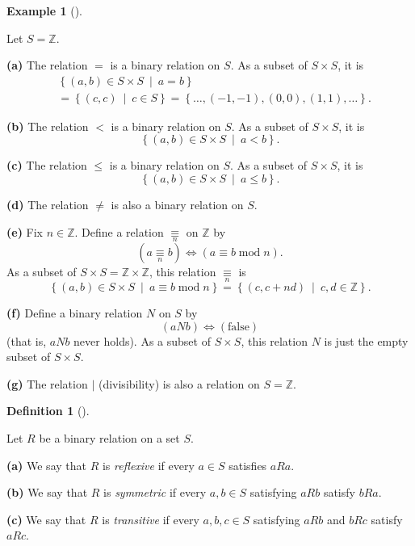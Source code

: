 \documentclass[numbers=enddot,12pt,final,onecolumn,notitlepage]{scrartcl}%
\numberwithin{exer}{subsection}
\theoremstyle{definition}
\newtheorem{defi}[theo]{Definition}
\newenvironment{definition}[1][]
{\begin{defi}[#1]\begin{leftbar}}
{\end{leftbar}\end{defi}}
\newtheorem{exam}[theo]{Example}
\newenvironment{example}[1][]
{\begin{exam}[#1]\begin{leftbar}}
{\end{leftbar}\end{exam}}
\begin{document}
\begin{example}
Let $S=\mathbb{Z}$.

\textbf{(a)} The relation $=$ is a binary relation on $S$. As a subset of
$S\times S$, it is%
\begin{align*}
&  \left\{  \left(  a,b\right)  \in S\times S\ \mid\ a=b\right\} \\
&  =\left\{  \left(  c,c\right)  \ \mid\ c\in S\right\}  =\left\{
\ldots,\left(  -1,-1\right)  ,\left(  0,0\right)  ,\left(  1,1\right)
,\ldots\right\}  .
\end{align*}


\textbf{(b)} The relation $<$ is a binary relation on $S$. As a subset of
$S\times S$, it is%
\[
\left\{  \left(  a,b\right)  \in S\times S\ \mid\ a<b\right\}  .
\]


\textbf{(c)} The relation $\leq$ is a binary relation on $S$. As a subset of
$S\times S$, it is%
\[
\left\{  \left(  a,b\right)  \in S\times S\ \mid\ a\leq b\right\}  .
\]


\textbf{(d)} The relation $\neq$ is also a binary relation on $S$.

\textbf{(e)} Fix $n\in\mathbb{Z}$. Define a relation $\underset{n}{\equiv}$ on
$\mathbb{Z}$ by
\[
\left(  a\underset{n}{\equiv}b\right)  \Longleftrightarrow\left(  a\equiv
b\operatorname{mod}n\right)  .
\]
As a subset of $S\times S=\mathbb{Z}\times\mathbb{Z}$, this relation
$\underset{n}{\equiv}$ is%
\[
\left\{  \left(  a,b\right)  \in S\times S\ \mid\ a\equiv b\operatorname{mod}%
n\right\}  =\left\{  \left(  c,c+nd\right)  \ \mid\ c,d\in\mathbb{Z}\right\}
.
\]


\textbf{(f)} Define a binary relation $N$ on $S$ by%
\[
\left(  aNb\right)  \Longleftrightarrow\left(  \text{false}\right)
\]
(that is, $aNb$ never holds). As a subset of $S\times S$, this relation $N$ is
just the empty subset of $S\times S$.

\textbf{(g)} The relation $\mid$ (divisibility) is also a relation on
$S=\mathbb{Z}$.
\end{example}

\begin{definition}
Let $R$ be a binary relation on a set $S$.

\textbf{(a)} We say that $R$ is \textit{reflexive} if every $a\in S$ satisfies
$aRa$.

\textbf{(b)} We say that $R$ is \textit{symmetric} if every $a,b\in S$
satisfying $aRb$ satisfy $bRa$.

\textbf{(c)} We say that $R$ is \textit{transitive} if every $a,b,c\in S$
satisfying $aRb$ and $bRc$ satisfy $aRc$.
\end{definition}
\end{document}
